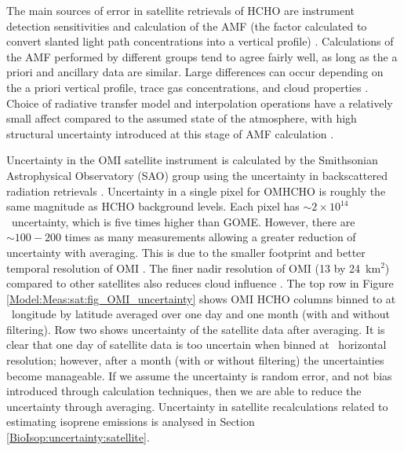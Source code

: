    The main sources of error in satellite retrievals of HCHO are instrument detection sensitivities and calculation of the AMF (the factor calculated to convert slanted light path concentrations into a vertical profile) \parencite{Millet2006}.
    Calculations of the AMF performed by different groups tend to agree fairly well, as long as the a priori and ancillary data are similar.
    Large differences can occur depending on the a priori vertical profile, trace gas concentrations, and cloud properties \parencite{Lorente2017}.
    Choice of radiative transfer model and interpolation operations have a relatively small affect compared to the assumed state of the atmosphere, with high structural uncertainty introduced at this stage of AMF calculation \parencite{Lorente2017}.
    
    Uncertainty in the OMI satellite instrument is calculated by the Smithsonian Astrophysical Observatory (SAO) group using the uncertainty in backscattered radiation retrievals \parencite{Abad2015, Abad2016}.
    Uncertainty in a single pixel for OMHCHO is roughly the same magnitude as HCHO background levels.
    Each pixel has $\sim 2 \times 10^{14}$\moleccm ~uncertainty, which is five times higher than GOME.
    However, there are $\sim 100-200 $ times as many measurements allowing a greater reduction of uncertainty with averaging.
    This is due to the smaller footprint and better temporal resolution of OMI \parencite{Chance2002,Millet2008}.
    The finer nadir resolution of OMI (13 by 24~km${^2}$) compared to other satellites also reduces cloud influence \parencite{Millet2006, Millet2008}.
    The top row in Figure \ref{Model:Meas:sat:fig_OMI_uncertainty} shows OMI HCHO columns binned to at \highhr ~longitude by latitude averaged over one day and one month (with and without filtering).
    Row two shows uncertainty of the satellite data after averaging.
    It is clear that one day of satellite data is too uncertain when binned at \highhr ~horizontal resolution; however, after a month (with or without filtering) the uncertainties become manageable.
    If we assume the uncertainty is random error, and not bias introduced through calculation techniques, then we are able to reduce the uncertainty through averaging.
    Uncertainty in satellite recalculations related to estimating isoprene emissions is analysed in Section \ref{BioIsop:uncertainty:satellite}.
    
